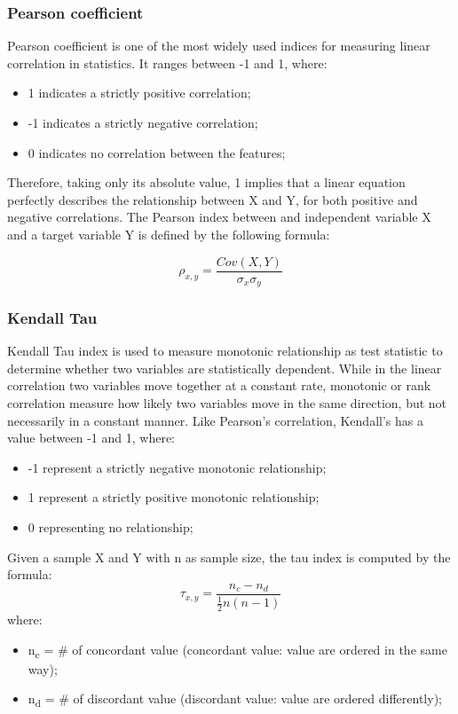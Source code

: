 \subsubsection{Pearson coefficient}
Pearson coefficient is one of the most widely used indices for measuring linear correlation in statistics. It ranges between -1 and 1, where:
\begin{itemize}
\item 1 indicates a strictly positive correlation;
\item -1 indicates a strictly negative correlation;
\item0 indicates no correlation between the features;
\end{itemize}

Therefore, taking only its absolute value, 1 implies that a linear equation perfectly describes the relationship between X and Y, for both positive and negative correlations. \newline
The Pearson index between and independent variable X and a target variable Y is defined by the following formula:

\begin{equation}
  \rho_{x,y} = \frac{Cov(X,Y)}{\sigma_x\sigma_y}
\end{equation}

\subsubsection{Kendall Tau}
Kendall Tau index is used to measure monotonic relationship as test statistic to determine whether two variables are statistically dependent. \newline
While in the linear correlation two variables move together at a constant rate, monotonic or rank correlation measure how likely two variables move in the same direction, but not necessarily in a constant manner. \newline
Like Pearson’s correlation, Kendall’s has a value between -1 and 1, where:

\begin{itemize}
\item -1 represent a strictly negative monotonic relationship;
\item 1 represent a strictly positive monotonic relationship;
\item 0 representing no relationship;
\end{itemize}
Given a sample X and Y with n as sample size, the tau index is computed by the formula:
\begin{equation}
  \tau_{x,y} = \frac{n_c-n_d}{\frac{1}{2}n(n-1)}
\end{equation}
where:
\begin{itemize}
\item n\textsubscript{c} = \# of concordant value (concordant value: value are ordered in the same way);
\item n\textsubscript{d} = \# of discordant value (discordant value: value are ordered differently);
\end{itemize}
